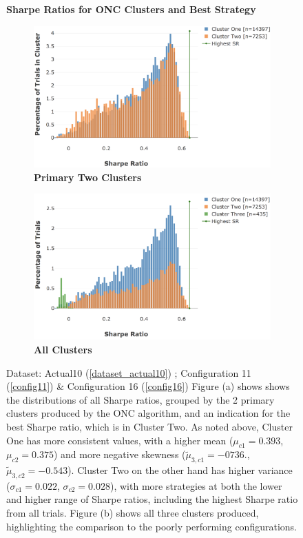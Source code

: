 \documentclass[a4paper,11pt,oneside]{article}
\theoremstyle{plain}
\theoremstyle{definition}
\begin{document}
		\begin{figure}[H]
		\centering
		\textbf{Sharpe Ratios for ONC Clusters and Best Strategy}
		\begin{subfigure}{.45\textwidth}
			\centering 
			\includegraphics[scale=0.325]{images/results/8_10_dsr/cluster_distributions_2.png} 
			\caption{\textbf{Primary Two Clusters}}
			\label{figure-dsr_clusters_3}
		\end{subfigure}%
		\begin{subfigure}{.45\textwidth}
			\includegraphics[scale=0.32]{images/results/8_10_dsr/cluster_distributions_3.png} 
			\caption{\textbf{All Clusters}}
			\label{figure-dsr_clusters_2}
		\end{subfigure}
		\caption[Sharpe Ratios for ONC Clusters and Best Strategy]{Dataset: Actual10 (\ref{dataset_actual10}) ; Configuration 11 (\ref{config11}) \&  Configuration 16 (\ref{config16})
			\newline Figure (a) shows shows the distributions of all Sharpe ratios, grouped by the 2 primary clusters produced by the ONC algorithm, and an indication for the best Sharpe ratio, which is in Cluster Two. As noted above, Cluster One has more consistent values, with a higher mean ($\mu_{c1} = 0.393$, $\mu_{c2} = 0.375$) and more negative skewness ($\tilde{\mu}_{3,c1} = -0736.$, $\tilde{\mu}_{3,c2} = -0.543$). Cluster Two on the other hand has higher variance ($\sigma_{c1} = 0.022$, $\sigma_{c2} = 0.028$), with more strategies at both the lower and higher range of Sharpe ratios, including the highest Sharpe ratio from all trials. Figure (b) shows all three clusters produced, highlighting the comparison to the poorly performing configurations.
		}
		\label{figure-dsr_clusters}
	\end{figure}
\end{document}
